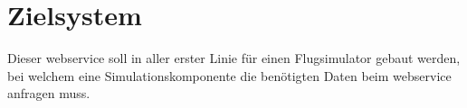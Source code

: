 \section{Zielsystem}\label{sec:zielsystem}

	Dieser \gls{webservice} soll in aller erster Linie für einen Flugsimulator gebaut werden,
	bei welchem eine Simulationskomponente die benötigten Daten beim \gls{webservice} anfragen muss.

	
	
	